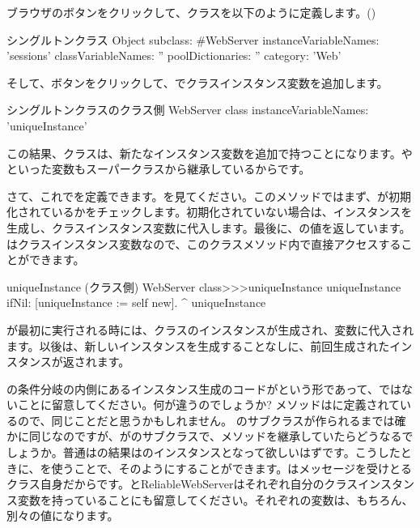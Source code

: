 \documentclass[a4paper,10pt,twoside]{book}
\begin{document}
ブラウザのボタンをクリックして、クラスを以下のように定義します。()

\begin{classdef}[singleton]{シングルトンクラス}
Object subclass: #WebServer
	instanceVariableNames: 'sessions' 	
	classVariableNames: '' 	
	poolDictionaries: '' 	
	category: 'Web'
\end{classdef}

そして、ボタンをクリックして、でクラスインスタンス変数を追加します。

\begin{classdef}[webserver]{シングルトンクラスのクラス側}
WebServer class 	
	instanceVariableNames: 'uniqueInstance'
\end{classdef}

この結果、クラスは、新たなインスタンス変数を追加で持つことになります。やといった変数もスーパークラスから継承しているからです。

さて、これでを定義できます。を見てください。このメソッドではまず、が初期化されているかをチェックします。初期化されていない場合は、インスタンスを生成し、クラスインスタンス変数に代入します。最後に、の値を返しています。はクラスインスタンス変数なので、このクラスメソッド内で直接アクセスすることができます。
    
\begin{method}[uniqueInstance]{uniqueInstance (クラス側)}
WebServer class>>>uniqueInstance
     uniqueInstance ifNil: [uniqueInstance := self new].
     ^ uniqueInstance
\end{method}

が最初に実行される時には、クラスのインスタンスが生成され、変数に代入されます。以後は、新しいインスタンスを生成することなしに、前回生成されたインスタンスが返されます。

の条件分岐の内側にあるインスタンス生成のコードがという形であって、ではないことに留意してください。何が違うのでしょうか?
メソッドはに定義されているので、同じことだと思うかもしれません。
のサブクラスが作られるまでは確かに同じなのですが、がのサブクラスで、メソッドを継承していたらどうなるでしょうか。普通はの結果はのインスタンスとなって欲しいはずです。こうしたときに、\self を使うことで、そのようにすることができます。\self はメッセージを受けとるクラス自身だからです。と{ReliableWebServer}はそれぞれ自分のクラスインスタンス変数を持っていることにも留意してください。それぞれの変数は、もちろん、別々の値になります。
\end{document}
